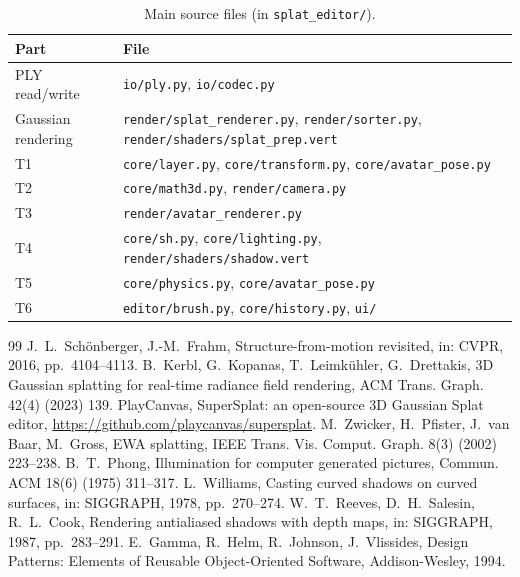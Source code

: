 \documentclass[9pt,twocolumn,a4paper]{extarticle}
\newcommand{\code}[1]{\texttt{#1}}
\begin{document}
\begin{table}[H]
\centering
\caption{Main source files (in \code{splat\_editor/}).}
\label{tab:src}
\footnotesize
\begin{tabular}{@{}p{2.2cm}>{\raggedright\arraybackslash}p{5.5cm}@{}}
\toprule
Part & File \\
\midrule
PLY read/write & \mbox{\code{io/ply.py}}, \mbox{\code{io/codec.py}} \\
Gaussian rendering & \mbox{\code{render/splat\_renderer.py}}, \mbox{\code{render/sorter.py}}, \mbox{\code{render/shaders/splat\_prep.vert}} \\
T1 & \mbox{\code{core/layer.py}}, \mbox{\code{core/transform.py}}, \mbox{\code{core/avatar\_pose.py}} \\
T2 & \mbox{\code{core/math3d.py}}, \mbox{\code{render/camera.py}} \\
T3 & \mbox{\code{render/avatar\_renderer.py}} \\
T4 & \mbox{\code{core/sh.py}}, \mbox{\code{core/lighting.py}}, \mbox{\code{render/shaders/shadow.vert}} \\
T5 & \mbox{\code{core/physics.py}}, \mbox{\code{core/avatar\_pose.py}} \\
T6 & \mbox{\code{editor/brush.py}}, \mbox{\code{core/history.py}}, \mbox{\code{ui/}} \\
\bottomrule
\end{tabular}
\end{table}

\begin{thebibliography}{99}\footnotesize\itemsep0pt\parskip0pt
 J.~L.~Sch{\"o}nberger, J.-M.~Frahm, Structure-from-motion revisited, in: CVPR, 2016, pp.~4104--4113.
 B.~Kerbl, G.~Kopanas, T.~Leimk{\"u}hler, G.~Drettakis, 3D Gaussian splatting for real-time radiance field rendering, ACM Trans. Graph. 42(4) (2023) 139.
 PlayCanvas, SuperSplat: an open-source 3D Gaussian Splat editor, \url{https://github.com/playcanvas/supersplat}.
 M.~Zwicker, H.~Pfister, J.~van Baar, M.~Gross, EWA splatting, IEEE Trans. Vis. Comput. Graph. 8(3) (2002) 223--238.
 B.~T.~Phong, Illumination for computer generated pictures, Commun. ACM 18(6) (1975) 311--317.
 L.~Williams, Casting curved shadows on curved surfaces, in: SIGGRAPH, 1978, pp.~270--274.
 W.~T.~Reeves, D.~H.~Salesin, R.~L.~Cook, Rendering antialiased shadows with depth maps, in: SIGGRAPH, 1987, pp.~283--291.
 E.~Gamma, R.~Helm, R.~Johnson, J.~Vlissides, Design Patterns: Elements of Reusable Object-Oriented Software, Addison-Wesley, 1994.
\end{thebibliography}
\end{document}
